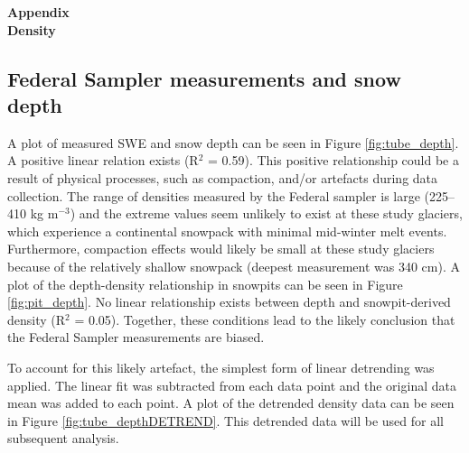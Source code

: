 \documentclass[12pt]{article}
\begin{document}

\begin{center}
\Large \textbf{Appendix\\ Density}
\end{center}

\subsection*{Federal Sampler measurements and snow depth}

A plot of measured SWE and snow depth can be seen in Figure \ref{fig:tube_depth}. A positive linear relation exists (R$^2$ = 0.59). This positive relationship could be a result of physical processes, such as compaction, and/or artefacts during data collection. The range of densities measured by the Federal sampler is large (225--410 kg m$^{-3}$) and the extreme values seem unlikely to exist at these study glaciers, which experience a continental snowpack with minimal mid-winter melt events. Furthermore, compaction effects would likely be small at these study glaciers because of the relatively shallow snowpack (deepest measurement was 340 cm). A plot of the depth-density relationship in snowpits can be seen in Figure \ref{fig:pit_depth}. No linear relationship exists between depth and snowpit-derived density (R$^2$ = 0.05). Together, these conditions lead to the likely conclusion that the Federal Sampler measurements are biased. 

To account for this likely artefact, the simplest form of linear detrending was applied. The linear fit was subtracted from each data point and the original data mean was added to each point. A plot of the detrended density data can be seen in Figure \ref{fig:tube_depthDETREND}. This detrended data will be used for all subsequent analysis. 
\end{document}
